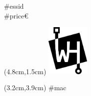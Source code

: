 \documentclass[10pt]{scrartcl}
\newcommand{\essid}{#essid}
\newcommand{\mac}{#mac}
\newcommand{\price}{#price}
\begin{document}
\vspace*{.2cm}
\noindent \LARGE\essid\\

\vspace*{-.5cm}
\noindent\price\euro
\begin{textblock*}{2cm}(4.8cm,1.5cm)
 \includegraphics[width=2.1cm]{whnetz-logo-sw.pdf}
\end{textblock*}
\begin{textblock*}{2cm}(3.2cm,3.9cm)
\tiny \mac
\end{textblock*}
\end{document}
